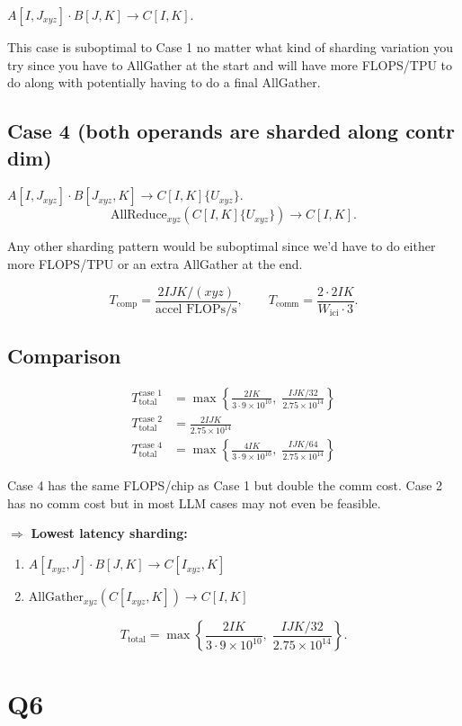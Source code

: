 \documentclass[11pt]{article}
\newcommand{\flopss}{\text{FLOPs/s}}
\newcommand{\Tcomm}{T_{\text{comm}}}
\newcommand{\Tcomp}{T_{\text{comp}}}
\newcommand{\Ttotal}{T_{\text{total}}}
\newcommand{\Wici}{W_{\text{ici}}}
\begin{document}
$A[I, J_{xyz}] \cdot B[J, K] \to C[I, K]$.

This case is suboptimal to Case 1 no matter what kind of sharding variation you try since you have to AllGather at the start and will have more FLOPS/TPU to do along with potentially having to do a final AllGather.

\subsection*{Case 4 (both operands are sharded along contr dim)}

$A[I, J_{xyz}] \cdot B[J_{xyz}, K] \to C[I, K]\{U_{xyz}\}$.
\[
\text{AllReduce}_{xyz}(C[I, K]\{U_{xyz}\}) \to C[I, K].
\]

Any other sharding pattern would be suboptimal since we'd have to do either more FLOPS/TPU or an extra AllGather at the end.

\[
\Tcomp = \frac{2IJK / (xyz)}{\text{accel }\flopss}, \qquad \Tcomm = \frac{2 \cdot 2IK}{\Wici \cdot 3}.
\]

\subsection*{Comparison}

\begin{align*}
\Ttotal^{\text{case 1}} &= \max\!\left\{\frac{2IK}{3 \cdot 9 \times 10^{10}},\; \frac{IJK/32}{2.75 \times 10^{14}}\right\} \\
\Ttotal^{\text{case 2}} &= \frac{2IJK}{2.75 \times 10^{14}} \\
\Ttotal^{\text{case 4}} &= \max\!\left\{\frac{4IK}{3 \cdot 9 \times 10^{10}},\; \frac{IJK/64}{2.75 \times 10^{14}}\right\}
\end{align*}

Case 4 has the same FLOPS/chip as Case 1 but double the comm cost. Case 2 has no comm cost but in most LLM cases may not even be feasible.

$\Rightarrow$ \textbf{Lowest latency sharding:}
\begin{enumerate}
  \item $A[I_{xyz}, J] \cdot B[J, K] \to C[I_{xyz}, K]$
  \item $\text{AllGather}_{xyz}(C[I_{xyz}, K]) \to C[I, K]$
\end{enumerate}
\[
\Ttotal = \max\!\left\{\frac{2IK}{3 \cdot 9 \times 10^{10}},\; \frac{IJK/32}{2.75 \times 10^{14}}\right\}.
\]

\section*{Q6}
\end{document}
